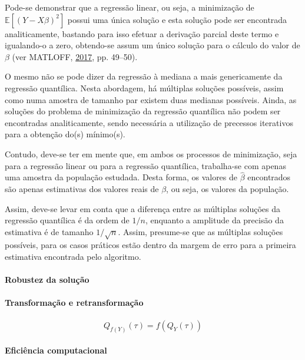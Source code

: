 \documentclass[a4paper, 12pt]{article}
\let\oldparagraph\paragraph
\renewcommand{\paragraph}[1]{\oldparagraph{#1}\mbox{}}
\begin{document}
Pode-se demonstrar que a regressão linear, ou seja, a minimização de
\(\mathbb{E}[(Y - X\beta)^2]\) possui uma única solução e esta solução
pode ser encontrada analiticamente, bastando para isso efetuar a
derivação parcial deste termo e igualando-o a zero, obtendo-se assum um
único solução para o cálculo do valor de \(\beta\) (ver MATLOFF,
\protect\hyperlink{ref-matloff2017}{2017}, pp. 49--50).

O mesmo não se pode dizer da regressão à mediana a mais genericamente da
regressão quantílica. Nesta abordagem, há múltiplas soluções possíveis,
assim como numa amostra de tamanho par existem duas medianas possíveis.
Ainda, as soluções do problema de minimização da regressão quantílica
não podem ser encontradas analiticamente, sendo necessária a utilização
de precessos iterativos para a obtenção do(s) mínimo(s).

Contudo, deve-se ter em mente que, em ambos os processos de minimização,
seja para a regressão linear ou para a regressão quantílica, trabalha-se
com apenas uma amostra da população estudada. Desta forma, os valores de
\(\hat \beta\) encontrados são apenas estimativas dos valores reais de
\(\beta\), ou seja, os valores da população.

Assim, deve-se levar em conta que a diferença entre as múltiplas
soluções da regressão quantílica é da ordem de \(1/n\), enquanto a
amplitude da precisão da estimativa é de tamanho \(1/\sqrt{n}\). Assim,
presume-se que as múltiplas soluções possíveis, para os casos práticos
estão dentro da margem de erro para a primeira estimativa encontrada
pelo algoritmo.

\hypertarget{robustez-da-solucao}{%
\paragraph{Robustez da solução}\label{robustez-da-solucao}}

\hypertarget{transformacao-e-retransformacao}{%
\paragraph{Transformação e
retransformação}\label{transformacao-e-retransformacao}}

\[Q_{f(Y)}(\tau) = f(Q_Y(\tau))\]

\hypertarget{eficiencia-computacional}{%
\paragraph{Eficiência computacional}\label{eficiencia-computacional}}
\end{document}
